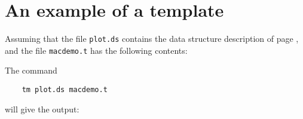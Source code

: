 \section{An example of a template}
Assuming that the file {\tt plot.ds} contains the data structure description
of page \pageref{plotds},
and the file {\tt macdemo.t} has the following contents:
\begin{flushleft}

\end{flushleft}
The command
\begin{verbatim}
    tm plot.ds macdemo.t
\end{verbatim}
will give the output:
\par
\begin{flushleft}

\end{flushleft}
